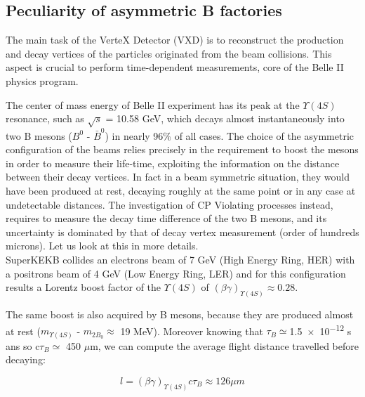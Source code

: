 
\subsection{Peculiarity of asymmetric B factories} \label{vertex_decay}

The main task of the VerteX Detector (VXD) is to reconstruct the production and decay vertices of the particles originated from the beam collisions. This aspect is crucial to perform time-dependent measurements, core of the Belle II physics program.%

The center of mass energy of Belle II experiment has its peak at the $\Upsilon(4S)$ resonance, such as $\sqrt{s}$ = 10.58 GeV, which decays almost instantaneously into two B mesons ($B^{0}$ - $\bar{B}^{0}$) in nearly 96\% of all cases. 
The choice of the asymmetric configuration of the beams relies precisely in the requirement to boost the mesons in order to measure their life-time, exploiting the information on the distance between their decay vertices. In fact in a beam symmetric situation, they would have been produced at rest, decaying roughly at the same point or in any case at undetectable distances. 
The investigation of CP Violating processes instead, requires to measure the decay time difference of the two B mesons, and its uncertainty is dominated by that of decay vertex measurement (order of hundreds microns). Let us look at this in more details.\\

SuperKEKB collides an electrons beam of 7 GeV (High Energy Ring, HER) with a positrons beam of 4 GeV (Low Energy Ring, LER) and for this configuration results a Lorentz boost factor of the $\Upsilon(4S)$ of $(\beta\gamma)_{\Upsilon(4S)} \approx 0.28 $.

The same boost is also acquired by B mesons, because they are produced almost at rest ($m_{\Upsilon(4S)}$ - $m_{2B_{0}}\approx$ 19 MeV). Moreover knowing that $\tau_{B}\simeq $\num{1.5e-12} s ans so c$\tau_{B}\simeq$ 450 $\mu$m, we can compute the average flight distance travelled before decaying:

\begin{equation}
\textit{l} = (\beta\gamma)_{\Upsilon(4S)}c\tau_{B} \approx 126 \mu m  
\end{equation} 

